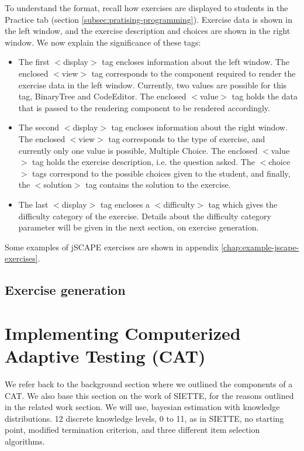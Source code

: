 To understand the format, recall how exercises are displayed to students in the Practice tab (section \ref{subsec:pratising-programming}). Exercise data is shown in the left window, and the exercise description and choices are shown in the right window.
We now explain the significance of these tags:
\begin{itemize}
\item The first \textsf{$<$display$>$} tag encloses information about the left window. The enclosed \textsf{$<$view$>$} tag corresponds to the component required to render the exercise data in the left window. Currently, two values are possible for this tag, \textsf{BinaryTree} and \textsf{CodeEditor}. The enclosed \textsf{$<$value$>$} tag holds the data that is passed to the rendering component to be rendered accordingly.
\item The second \textsf{$<$display$>$} tag encloses information about the right window. The enclosed \textsf{$<$view$>$} tag corresponds to the type of exercise, and currently only one value is possible, \textsf{Multiple Choice}. The enclosed \textsf{$<$value$>$} tag holds the exercise description, i.e. the question asked. The \textsf{$<$choice$>$} tags correspond to the possible choices given to the student, and finally, the \textsf{$<$solution$>$} tag contains the solution to the exercise.
\item The last \textsf{$<$display$>$} tag encloses a \textsf{$<$difficulty$>$} tag which gives the difficulty category of the exercise. Details about the difficulty category parameter will be given in the next section, on exercise generation.
\end{itemize}

Some examples of jSCAPE exercises are shown in appendix \ref{chap:example-jscape-exercises}.

\subsection{Exercise generation}
\label{exercise-generation}

\section{Implementing Computerized Adaptive Testing (CAT)}
We refer back to the background section where we outlined the components of a CAT. We also base this section on the work of SIETTE, for the reasons outlined in the related work section. We will use, bayesian estimation with knowledge distributions. 12 discrete knowledge levels, 0 to 11, as in SIETTE, no starting point, modified termination criterion, and three different item selection algorithms.

